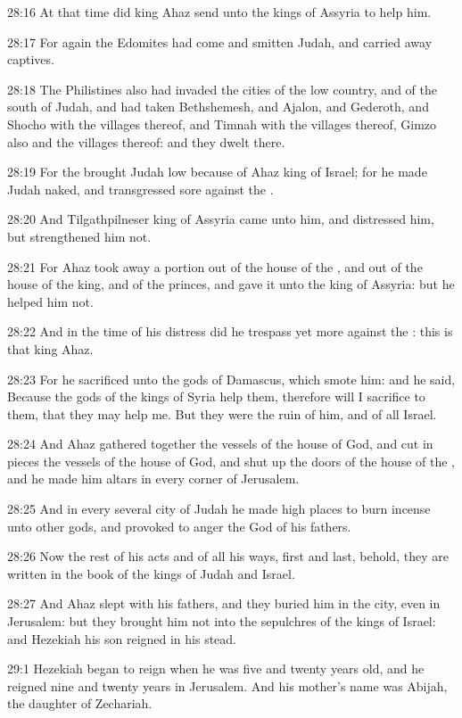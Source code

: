 28:16 At that time did king Ahaz send unto the kings of Assyria to help him.

28:17 For again the Edomites had come and smitten Judah, and carried away captives.

28:18 The Philistines also had invaded the cities of the low country, and of the south of Judah, and had taken Bethshemesh, and Ajalon, and Gederoth, and Shocho with the villages thereof, and Timnah with the villages thereof, Gimzo also and the villages thereof: and they dwelt there.

28:19 For the \LORD brought Judah low because of Ahaz king of Israel; for he made Judah naked, and transgressed sore against the \LORD.

28:20 And Tilgathpilneser king of Assyria came unto him, and distressed him, but strengthened him not.

28:21 For Ahaz took away a portion out of the house of the \LORD, and out of the house of the king, and of the princes, and gave it unto the king of Assyria: but he helped him not.

28:22 And in the time of his distress did he trespass yet more against the \LORD: this is that king Ahaz.

28:23 For he sacrificed unto the gods of Damascus, which smote him: and he said, Because the gods of the kings of Syria help them, therefore will I sacrifice to them, that they may help me. But they were the ruin of him, and of all Israel.

28:24 And Ahaz gathered together the vessels of the house of God, and cut in pieces the vessels of the house of God, and shut up the doors of the house of the \LORD, and he made him altars in every corner of Jerusalem.

28:25 And in every several city of Judah he made high places to burn incense unto other gods, and provoked to anger the \LORD God of his fathers.

28:26 Now the rest of his acts and of all his ways, first and last, behold, they are written in the book of the kings of Judah and Israel.

28:27 And Ahaz slept with his fathers, and they buried him in the city, even in Jerusalem: but they brought him not into the sepulchres of the kings of Israel: and Hezekiah his son reigned in his stead.

29:1 Hezekiah began to reign when he was five and twenty years old, and he reigned nine and twenty years in Jerusalem. And his mother's name was Abijah, the daughter of Zechariah.

